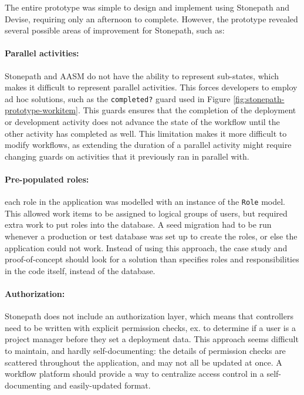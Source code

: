 \documentclass[document.tex]{subfiles}
\begin{document}
The entire prototype was simple to design and implement using Stonepath and Devise, requiring only an afternoon to complete. However, the prototype revealed several possible areas of improvement for Stonepath, such as:

\paragraph{Parallel activities:} Stonepath and AASM do not have the ability to represent sub-states, which makes it difficult to represent parallel activities. This forces developers to employ ad hoc solutions, such as the \verb!completed?! guard used in Figure \ref{fig:stonepath-prototype-workitem}. This guards ensures that the completion of the deployment or development activity does not advance the state of the workflow until the other activity has completed as well. This limitation makes it more difficult to modify workflows, as extending the duration of a parallel activity might require changing guards on activities that it previously ran in parallel with.

\paragraph{Pre-populated roles:} each role in the application was modelled with an instance of the \verb!Role! model. This allowed work items to be assigned to logical groups of users, but required extra work to put roles into the database. A seed migration had to be run whenever a production or test database was set up to create the roles, or else the application could not work. Instead of using this approach, the case study and proof-of-concept should look for a solution than specifies roles and responsibilities in the code itself, instead of the database.

\paragraph{Authorization:} Stonepath does not include an authorization layer, which means that controllers need to be written with explicit permission checks, ex. to determine if a user is a project manager before they set a deployment data. This approach seems difficult to maintain, and hardly self-documenting: the details of permission checks are scattered throughout the application, and may not all be updated at once. A workflow platform should provide a way to centralize access control in a self-documenting and easily-updated format.
\end{document}
